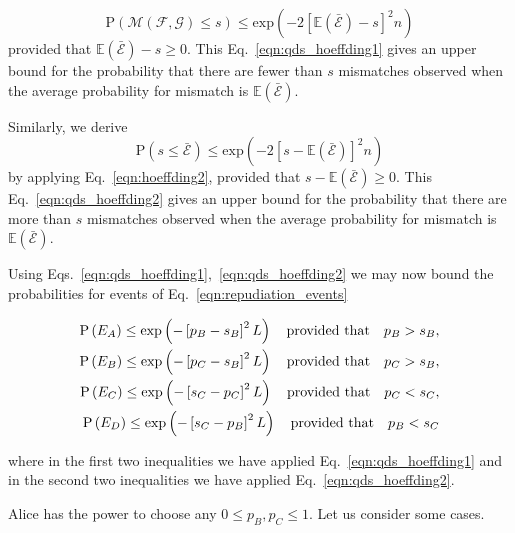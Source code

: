 \begin{equation}\label{eqn:qds_hoeffding1}
\text{P}\left(\mathcal{M}\left(\mathcal{F}, \mathcal{G}\right) \le s \right) \le \text{exp}\left(- 2 \left[\mathbb{E}\left(\bar{\mathcal{E}}\right) - s\right]^2 n \right)
\end{equation}
provided that $\mathbb{E}\left(\bar{\mathcal{E}}\right) - s \ge 0$. This Eq.~\ref{eqn:qds_hoeffding1} gives an upper bound for the probability that there are fewer than $s$ mismatches observed when the average probability for mismatch is $\mathbb{E}\left(\bar{\mathcal{E}}\right)$.

Similarly, we derive
\begin{equation}\label{eqn:qds_hoeffding2}
\text{P}\left(s \le \bar{\mathcal{E}}\right) \le \text{exp}\left( - 2 \left[s - \mathbb{E}\left(\bar{\mathcal{E}}\right)\right]^2 n\right)
\end{equation}
by applying Eq.~\ref{eqn:hoeffding2}, provided that $s - \mathbb{E}\left(\bar{\mathcal{E}}\right) \ge 0$. This Eq.~\ref{eqn:qds_hoeffding2} gives an upper bound for the probability that there are more than $s$ mismatches observed when the average probability for mismatch is $\mathbb{E}\left(\bar{\mathcal{E}}\right)$. 


Using Eqs.~\ref{eqn:qds_hoeffding1},~\ref{eqn:qds_hoeffding2} we may now bound the probabilities for events of Eq.~\ref{eqn:repudiation_events}

\begin{align}\label{eqn:qds_repudiation_events_probs}
\text{P}\left(E_A\right) \le \text{exp}\left( -\left[p_B - s_B\right]^2 L \right) \qq{provided that} p_B > s_B, \notag \\
\text{P}\left(E_B\right) \le \text{exp}\left( -\left[p_C - s_B\right]^2 L \right) \qq{provided that} p_C > s_B, \notag \\
\text{P}\left(E_C\right) \le \text{exp}\left( -\left[s_C - p_C\right]^2 L \right) \qq{provided that} p_C < s_C, \notag \\
\text{P}\left(E_D\right) \le \text{exp}\left( -\left[s_C - p_B\right]^2 L \right) \qq{provided that} p_B < s_C
\end{align}

\noindent where in the first two inequalities we have applied Eq.~\ref{eqn:qds_hoeffding1} and in the second two inequalities we have applied Eq.~\ref{eqn:qds_hoeffding2}. 

Alice has the power to choose any $0 \le p_B, p_C \le 1$. Let us consider some cases.

